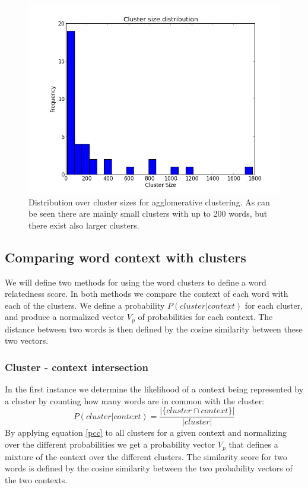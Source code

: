 \documentclass[11pt]{article}
\begin{document}
\begin{figure}
\center
\includegraphics[scale=0.40]{images/cluster_size.png}
\caption{Distribution over cluster sizes for agglomerative clustering. As can be seen there are mainly small clusters with up to 200 words, but there exist also larger clusters.}
\label{cluster_size}
\end{figure}

\subsection{Comparing word context with clusters}
We will define two methods for using the word clusters to define a word relatedness score. In both methods we compare the context of each word with each of the clusters. We define a probability $P( cluster | context )$ for each cluster, and produce a normalized vector $V_p$ of probabilities for each context. The distance between two words is then defined by the cosine similarity between these two vectors.

\subsubsection{Cluster - context intersection}
In the first instance we determine the likelihood of a context being represented by a cluster by counting how many words are in common with the cluster:
\begin{equation} \label{pcc}P( \textit{cluster} | \textit{context}) = \frac{ | \{\textit{cluster} \cap \textit{context}\} |  }{| \textit{cluster} |} \end{equation}
By applying equation \ref{pcc} to all clusters for a given context and normalizing over the different probabilities we get a probability vector $V_{p}$ that defines a mixture of the context over the different clusters. The similarity score for two words is defined by the cosine similarity between the two probability vectors of the two contexts.
\end{document}
